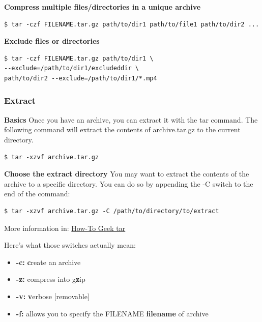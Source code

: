 \documentclass{article}
\newenvironment{codetemplate}[1][]{%
  \mybasecolorbox[#1]
  \itshape
}{%
  \endmybasecolorbox
}
\begin{document}
\textbf{Compress multiple files/directories in a unique archive}
\begin{codetemplate}{}
\begin{verbatim}
$ tar -czf FILENAME.tar.gz path/to/dir1 path/to/file1 path/to/dir2 ...
\end{verbatim}
\end{codetemplate}

\textbf{Exclude files or directories}
\begin{codetemplate}{}
\begin{verbatim}
$ tar -czf FILENAME.tar.gz path/to/dir1 \
--exclude=/path/to/dir1/excludeddir \
path/to/dir2 --exclude=/path/to/dir1/*.mp4
\end{verbatim}
\end{codetemplate}

\subsubsection{Extract}
\textbf{Basics}
\newline
Once you have an archive, you can extract it with the tar command. The following command will extract the contents of archive.tar.gz to the current directory.
\begin{codetemplate}{}
\begin{verbatim}
$ tar -xzvf archive.tar.gz
\end{verbatim}
\end{codetemplate}
\textbf{Choose the extract directory}
\newline
You may want to extract the contents of the archive to a specific directory. You can do so by appending the -C switch to the end of the command:
\begin{codetemplate}{}
\begin{verbatim}
$ tar -xzvf archive.tar.gz -C /path/to/directory/to/extract
\end{verbatim}
\end{codetemplate}

More information in: \href{https://www.howtogeek.com/248780/how-to-compress-and-extract-files-using-the-tar-command-on-linux/}{How-To Geek tar}

Here’s what those switches actually mean:

\begin{itemize}
    \item \textbf{-c:} \textbf{c}reate an archive
    \item \textbf{-z:} compress into g\textbf{z}ip
    \item \textbf{-v:} \textbf{v}erbose [removable]
    \item \textbf{-f:} allows you to specify the FILENAME \textbf{filename} of archive
\end{itemize}
\end{document}
